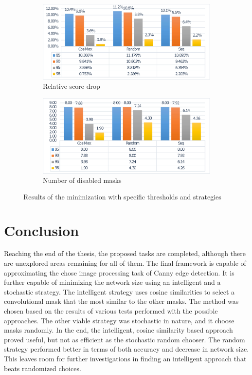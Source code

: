 \documentclass[12pt]{report}
\begin{document}
\begin{figure}
	\centering
	\begin{subfigure}[b]{\linewidth}
		\centering
		\includegraphics[width=0.9\linewidth]{dia/stat2.eps}
		\caption{Relative score drop}
	\end{subfigure}
	\begin{subfigure}[b]{\linewidth}
		\centering
		\includegraphics[width=0.9\linewidth]{dia/stat1.eps}
		\caption{Number of disabled masks}
	\end{subfigure}
	\caption{Results of the minimization with specific thresholds and strategies}
	\label{fin}
\end{figure}

\chapter{Conclusion}
Reaching the end of the thesis, the proposed tasks are completed, although there are unexplored areas remaining for all of them. The final framework is capable of approximating the chose image processing task of Canny edge detection. It is further capable of minimizing the network size using an intelligent and a stochastic strategy. The intelligent strategy uses cosine similarities to select a convolutional mask that the most similar to the other masks. The method was chosen based on the results of various tests performed with the possible approaches. The other viable strategy was stochastic in nature, and it choose masks randomly. In the end, the intelligent, cosine similarity based approach proved useful, but not as efficient as the stochastic random chooser. The random strategy performed better in terms of both accuracy and decrease in network size. This leaves room for further investigations in finding an intelligent approach that beats randomized choices.
\end{document}
